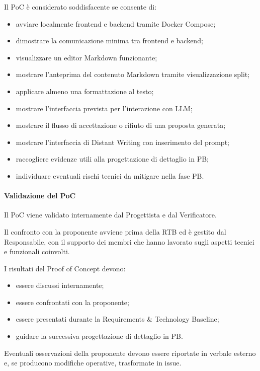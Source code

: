 Il PoC è considerato soddisfacente se consente di:

\begin{itemize}
    \item avviare localmente frontend e backend tramite Docker Compose;
    \item dimostrare la comunicazione minima tra frontend e backend;
    \item visualizzare un editor Markdown funzionante;
    \item mostrare l'anteprima del contenuto Markdown tramite visualizzazione split;
    \item applicare almeno una formattazione al testo;
    \item mostrare l'interfaccia prevista per l'interazione con LLM;
    \item mostrare il flusso di accettazione o rifiuto di una proposta generata;
    \item mostrare l'interfaccia di Distant Writing con inserimento del prompt;
    \item raccogliere evidenze utili alla progettazione di dettaglio in PB;
    \item individuare eventuali rischi tecnici da mitigare nella fase PB.
\end{itemize}

\paragraph{Validazione del PoC}

Il PoC viene validato internamente dal Progettista e dal Verificatore.

Il confronto con la proponente avviene prima della RTB ed è gestito dal
Responsabile, con il supporto dei membri che hanno lavorato sugli aspetti tecnici
e funzionali coinvolti.

I risultati del Proof of Concept devono:

\begin{itemize}
    \item essere discussi internamente;
    \item essere confrontati con la proponente;
    \item essere presentati durante la Requirements \& Technology Baseline;
    \item guidare la successiva progettazione di dettaglio in PB.
\end{itemize}

Eventuali osservazioni della proponente devono essere riportate in verbale esterno
e, se producono modifiche operative, trasformate in issue.

